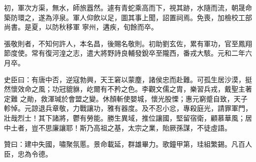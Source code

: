 \begin{pinyinscope}
 初，軍次方渠，無水，師旅囂然。遽有青蛇乘高而下，視其跡，水隨而流，朝晟命築防環之，遂為渟泉。軍人仰飲以足，圖其事上聞，詔置祠焉。免喪，加檢校工部尚書。是夏，以防秋移軍
 寧州，遘疾，旬餘而卒。



 張敬則者，不知何許人，本名昌，後賜名敬則。初助劉玄佐，累有軍功，官至鳳翔節度使。常有復河湟之志，遣大將野詩良輔發銳卒至隴西，番戎大駭。元和二年六月卒。



 史臣曰：有唐中否，逆寇勃興，天王窘以蒙塵，諸侯忠而赴難。可孤生居沙漠，挺然懷效命之風；功冠貔貅，屹爾有不矜之色。李觀文儒之胄，樂習兵戎，戴聖主著定難
 之勛，救渾瑊於會盟之變。休顏斬使嬰城，懷光股慄；惠元窮蹙自致，天子軫悼。元諒退兵章敬，力戰讓功，雅有器度。及不忍小忿，專殺庭光，請罪軍門，壯哉烈士！其下諸將，鬱有勞能。勝生異域，推位讓國，堅留宿衛，顧慕華風；居中土者，豈不思廉讓耶！斯乃高祖之基，太宗之業，貽厥孫謀，不徒虛語。



 贊曰：建中失國，嘯聚氛慝。景命載延，群雄畢力。歌鐘甲第，珪組繁錫。凡百人臣，忠為令德。



\end{pinyinscope}